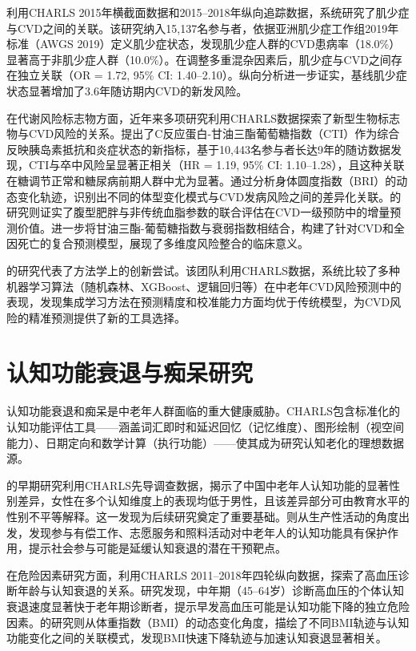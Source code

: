 \documentclass[12pt,a4paper]{article}
\begin{document}
\citet{gao2022sarcopenia}利用CHARLS 2015年横截面数据和2015--2018年纵向追踪数据，系统研究了肌少症与CVD之间的关联。该研究纳入15,137名参与者，依据亚洲肌少症工作组2019年标准（AWGS 2019）定义肌少症状态，发现肌少症人群的CVD患病率（18.0\%）显著高于非肌少症人群（10.0\%）。在调整多重混杂因素后，肌少症与CVD之间存在独立关联（OR = 1.72, 95\% CI: 1.40--2.10）。纵向分析进一步证实，基线肌少症状态显著增加了3.6年随访期内CVD的新发风险。

在代谢风险标志物方面，近年来多项研究利用CHARLS数据探索了新型生物标志物与CVD风险的关系。\citet{huo2025cti}提出了C反应蛋白-甘油三酯葡萄糖指数（CTI）作为综合反映胰岛素抵抗和炎症状态的新指标，基于10,443名参与者长达9年的随访数据发现，CTI与卒中风险呈显著正相关（HR = 1.19, 95\% CI: 1.10--1.28），且这种关联在糖调节正常和糖尿病前期人群中尤为显著。\citet{yang2024bri}通过分析身体圆度指数（BRI）的动态变化轨迹，识别出不同的体型变化模式与CVD发病风险之间的差异化关联。\citet{lai2025abdominal}的研究则证实了腹型肥胖与非传统血脂参数的联合评估在CVD一级预防中的增量预测价值。\citet{zhao2025tyg}进一步将甘油三酯-葡萄糖指数与衰弱指数相结合，构建了针对CVD和全因死亡的复合预测模型，展现了多维度风险整合的临床意义。

\citet{huang2025cvd}的研究代表了方法学上的创新尝试。该团队利用CHARLS数据，系统比较了多种机器学习算法（随机森林、XGBoost、逻辑回归等）在中老年CVD风险预测中的表现，发现集成学习方法在预测精度和校准能力方面均优于传统模型，为CVD风险的精准预测提供了新的工具选择。

\section{认知功能衰退与痴呆研究}

认知功能衰退和痴呆是中老年人群面临的重大健康威胁。CHARLS包含标准化的认知功能评估工具——涵盖词汇即时和延迟回忆（记忆维度）、图形绘制（视空间能力）、日期定向和数学计算（执行功能）——使其成为研究认知老化的理想数据源。

\citet{lei2012gender}的早期研究利用CHARLS先导调查数据，揭示了中国中老年人认知功能的显著性别差异，女性在多个认知维度上的表现均低于男性，且该差异部分可由教育水平的性别不平等解释。这一发现为后续研究奠定了重要基础。\citet{luo2018cognitive}则从生产性活动的角度出发，发现参与有偿工作、志愿服务和照料活动对中老年人的认知功能具有保护作用，提示社会参与可能是延缓认知衰退的潜在干预靶点。

在危险因素研究方面，\citet{ding2023hypertension}利用CHARLS 2011--2018年四轮纵向数据，探索了高血压诊断年龄与认知衰退的关系。研究发现，中年期（45--64岁）诊断高血压的个体认知衰退速度显著快于老年期诊断者，提示早发高血压可能是认知功能下降的独立危险因素。\citet{zhang2022bmi}的研究则从体重指数（BMI）的动态变化角度，描绘了不同BMI轨迹与认知功能变化之间的关联模式，发现BMI快速下降轨迹与加速认知衰退显著相关。
\end{document}
